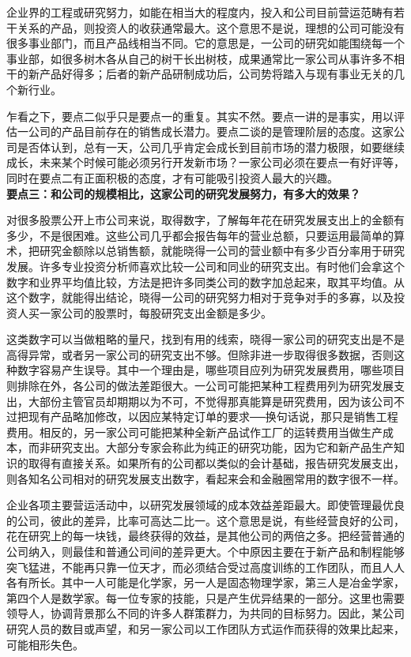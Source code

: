 \documentclass[UTF8,a4paper,zihao=-4,fontset = windows]{ctexart} %
\begin{document}
企业界的工程或研究努力，如能在相当大的程度内，投入和公司目前营运范畴有若干关系的产品，则投资人的收获通常最大。这个意思不是说，理想的公司可能没有很多事业部门，而且产品线相当不同。它的意思是，一公司的研究如能围绕每一个事业部，如很多树木各从自己的树干长出树枝，成果通常比一家公司从事许多不相干的新产品好得多；后者的新产品研制成功后，公司势将踏入与现有事业无关的几个新行业。

乍看之下，要点二似乎只是要点一的重复。其实不然。要点一讲的是事实，用以评估一公司的产品目前存在的销售成长潜力。要点二谈的是管理阶层的态度。这家公司是否体认到，总有一天，公司几乎肯定会成长到目前市场的潜力极限，如要继续成长，未来某个时候可能必须另行开发新市场？一家公司必须在要点一有好评等，同时在要点二有正面积极的态度，才有可能吸引投资人最大的兴趣。
\\

\textbf{要点三：和公司的规模相比，这家公司的研究发展努力，有多大的效果？}


对很多股票公开上市公司来说，取得数字，了解每年花在研究发展支出上的金额有多少，不是很困难。这些公司几乎都会报告每年的营业总额，只要运用最简单的算术，把研究金额除以总销售额，就能晓得一公司的营业额中有多少百分率用于研究发展。许多专业投资分析师喜欢比较一公司和同业的研究支出。有时他们会拿这个数字和业界平均值比较，方法是把许多同类公司的数字加总起来，取其平均值。从这个数字，就能得出结论，晓得一公司的研究努力相对于竞争对手的多寡，以及投资人买一家公司的股票时，每股研究支出金额是多少。

这类数字可以当做粗略的量尺，找到有用的线索，晓得一家公司的研究支出是不是高得异常，或者另一家公司的研究支出不够。但除非进一步取得很多数据，否则这种数字容易产生误导。其中一个理由是，哪些项目应列为研究发展费用，哪些项目则排除在外，各公司的做法差距很大。一公司可能把某种工程费用列为研究发展支出，大部份主管官员却期期以为不可，不觉得那真能算是研究费用，因为该公司不过把现有产品略加修改，以因应某特定订单的要求──换句话说，那只是销售工程费用。相反的，另一家公司可能把某种全新产品试作工厂的运转费用当做生产成本，而非研究支出。大部分专家会称此为纯正的研究功能，因为它和新产品生产知识的取得有直接关系。如果所有的公司都以类似的会计基础，报告研究发展支出，则各知名公司相对的研究发展支出数字，看起来会和金融圈常用的数字很不一样。

企业各项主要营运活动中，以研究发展领域的成本效益差距最大。即使管理最优良的公司，彼此的差异，比率可高达二比一。这个意思是说，有些经营良好的公司，花在研究上的每一块钱，最终获得的效益，是其他公司的两倍之多。把经营普通的公司纳入，则最佳和普通公司间的差异更大。个中原因主要在于新产品和制程能够突飞猛进，不能再只靠一位天才，而必须结合受过高度训练的工作团队，而且人人各有所长。其中一人可能是化学家，另一人是固态物理学家，第三人是冶金学家，第四个人是数学家。每一位专家的技能，只是产生优异结果的一部分。这里也需要领导人，协调背景那么不同的许多人群策群力，为共同的目标努力。因此，某公司研究人员的数目或声望，和另一家公司以工作团队方式运作而获得的效果比起来，可能相形失色。
\end{document}
